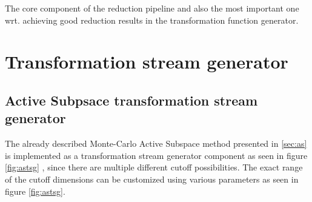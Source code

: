 \documentclass[
  a4paper,  %
  twoside,  %
  bibliography=totoc,
  headsepline,
  cleardoublepage=empty,
  parskip=half,
  draft=false
]{scrbook}
\begin{document}
The core component of the reduction pipeline and also the most important one wrt. achieving good reduction results in the transformation function generator.

\newpage

\section{Transformation stream generator}

\subsection{Active Subpsace transformation stream generator}

The already described Monte-Carlo Active Subspace method presented in \ref{sec:as} is implemented as a transformation stream generator component as seen in figure \ref{fig:astsg} , since there are multiple different cutoff possibilities.
The exact range of the cutoff dimensions can be customized using various parameters as seen in figure \ref{fig:astsg}.
\end{document}
